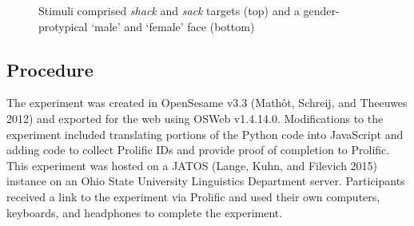 \documentclass[
  letterpaper,
  DIV=11,
  numbers=noendperiod]{scrartcl}
\begin{document}
\begin{figure}


\caption{\label{fig-visual}Stimuli comprised \emph{shack} and
\emph{sack} targets (top) and a gender-protypical `male' and `female'
face (bottom)}

\end{figure}%

\subsection{Procedure}\label{sec-procedure}

The experiment was created in OpenSesame v3.3 (Mathôt, Schreij, and
Theeuwes 2012) and exported for the web using OSWeb v1.4.14.0.
Modifications to the experiment included translating portions of the
Python code into JavaScript and adding code to collect Prolific IDs and
provide proof of completion to Prolific. This experiment was hosted on a
JATOS (Lange, Kuhn, and Filevich 2015) instance on an Ohio State
University Linguistics Department server. Participants received a link
to the experiment via Prolific and used their own computers, keyboards,
and headphones to complete the experiment.
\end{document}
